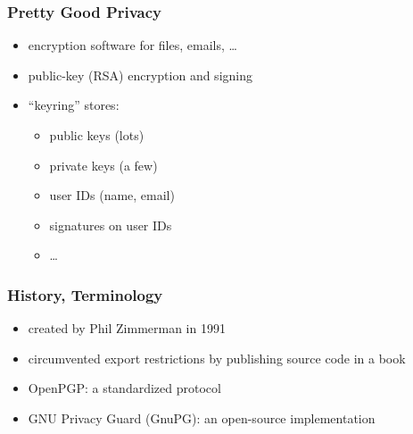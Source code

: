 \documentclass{beamer}
\begin{document}
\begin{frame}
  \frametitle{Pretty Good Privacy}

  \begin{itemize}
    \item encryption software for files, emails, \ldots
    \item public-key (RSA) encryption and signing
    \item ``keyring'' stores:
      \begin{itemize}
        \item public keys (lots)
        \item private keys (a few)
        \item user IDs (name, email)
        \item signatures on user IDs
        \item \ldots
      \end{itemize}
  \end{itemize}
\end{frame}

\begin{frame}
  \frametitle{History, Terminology}

  \begin{itemize}
    \item created by Phil Zimmerman in 1991
    \item circumvented export restrictions by publishing source code in a book
    \item OpenPGP: a standardized protocol
    \item GNU Privacy Guard (GnuPG): an open-source implementation
  \end{itemize}
\end{frame}
\end{document}
